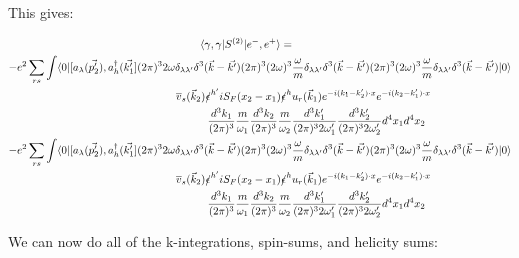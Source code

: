 \documentclass[a4]{article}
\begin{document}
\begin{framed}
            This gives:

            \begin{equation}
                \begin{aligned}
                    \langle \gamma, \gamma | S^{(2)} | e^{-}, e^{+} \rangle = & \\
                    - e^{2} \sum_{r s} \int \langle 0 |[a_{\lambda} (\vec{p'_2}),a^{\dagger}_{h} (\vec{k'_1}] (2 \pi)^{3} 2 \omega \delta_{\lambda \lambda'} \delta^{3} (\vec{k} - \vec{k'}) (2 \pi)^{3} (2 \omega)^{3} & \frac{\omega}{m} \delta_{\lambda \lambda'} \delta^{3} (\vec{k} - \vec{k'}) (2 \pi)^{3} (2 \omega)^{3} \frac{\omega}{m} \delta_{\lambda \lambda'} \delta^{3} (\vec{k} - \vec{k'})| 0 \rangle \\
                    \overline{v}_{s} (\vec{k}_2) \slashed{\epsilon}^{h'} i S_{F} (x_2 - x_1) \slashed{\epsilon}^{h} & u_{r} (\vec{k}_1) e^{- i (k_1 - k'_2) \cdot x} e^{- i (k_2 - k'_1) \cdot x} \\
                    \frac{d^3 k_1}{(2 \pi)^{3}} \frac{m}{\omega_1} \frac{d^3 k_2}{(2 \pi)^{3}} \frac{m}{\omega_2} & \frac{d^3 k'_1}{(2 \pi)^{3} 2 \omega'_1} \frac{d^3 k'_2}{(2 \pi)^{3} 2 \omega'_2} d^4 x_1 d^4 x_2 \\
                    - e^{2} \sum_{r s} \int \langle 0 |[a_{\lambda} (\vec{p'_2}),a^{\dagger}_{h} (\vec{k'_1}] (2 \pi)^{3} 2 \omega \delta_{\lambda \lambda'} \delta^{3} (\vec{k} - \vec{k'}) (2 \pi)^{3} (2 \omega)^{3} & \frac{\omega}{m} \delta_{\lambda \lambda'} \delta^{3} (\vec{k} - \vec{k'}) (2 \pi)^{3} (2 \omega)^{3} \frac{\omega}{m} \delta_{\lambda \lambda'} \delta^{3} (\vec{k} - \vec{k'})| 0 \rangle \\
                    \overline{v}_{s} (\vec{k}_2) \slashed{\epsilon}^{h'} i S_{F} (x_2 - x_1) \slashed{\epsilon}^{h} & u_{r} (\vec{k}_1) e^{- i (k_1 - k'_2) \cdot x} e^{- i (k_2 - k'_1) \cdot x} \\
                    \frac{d^3 k_1}{(2 \pi)^{3}} \frac{m}{\omega_1} \frac{d^3 k_2}{(2 \pi)^{3}} \frac{m}{\omega_2} & \frac{d^3 k'_1}{(2 \pi)^{3} 2 \omega'_1} \frac{d^3 k'_2}{(2 \pi)^{3} 2 \omega'_2} d^4 x_1 d^4 x_2
                \end{aligned}
            \end{equation}

            We can now do all of the k-integrations, spin-sums, and helicity sums:


\end{framed}
\end{document}
